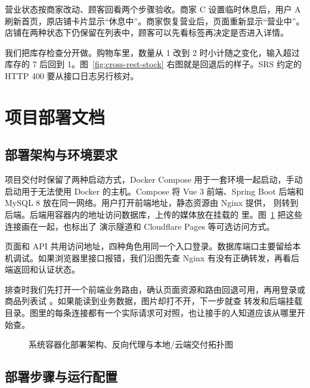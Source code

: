 营业状态按商家改动、顾客回看两个步骤验收。商家 C 设置临时休息后，用户 A 刷新首页，原店铺卡片显示“休息中”。商家恢复营业后，页面重新显示“营业中”。店铺在两种状态下仍保留在列表中，顾客可以先看标签再决定是否进入详情。

我们把库存检查分开做。购物车里，数量从 1 改到 2 时小计随之变化，输入超过库存的 7 后回到 1。图~\ref{fig:cross-rest-stock} 右图就是回退后的样子。SRS 约定的 HTTP 400 要从接口日志另行核对。


\clearpage
\section{项目部署文档}

\subsection{部署架构与环境要求}

项目交付时保留了两种启动方式，Docker Compose 用于一套环境一起启动，手动启动用于无法使用 Docker 的主机。Compose 将 Vue 3 前端、Spring Boot 后端和 MySQL 8 放在同一网络。用户打开前端地址，静态资源由 Nginx 提供， 则转到后端。后端用容器内的地址访问数据库，上传的媒体放在挂载的  里。图~\ref{fig:deploy-arch} 把这些连接画在一起，也标出了  演示隧道和 Cloudflare Pages 等可选访问方式。

页面和 API 共用访问地址，四种角色用同一个入口登录。数据库端口主要留给本机调试。如果浏览器里接口报错，我们沿图先查 Nginx 有没有正确转发，再看后端返回和认证状态。

排查时我们先打开一个前端业务路由，确认页面资源和路由回退可用，再用登录或商品列表试 。如果能读到业务数据，图片却打不开，下一步就查  转发和后端挂载目录。图里的每条连接都有一个实际请求可对照，也让接手的人知道应该从哪里开始查。

\begin{figure}[!htbp]
  \centering
  \resizebox{.95\linewidth}{!}{}
  \caption{系统容器化部署架构、反向代理与本地/云端交付拓扑图}\label{fig:deploy-arch}
\end{figure}

\clearpage
\subsection{部署步骤与运行配置}

